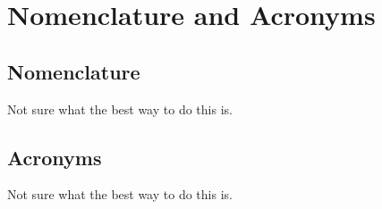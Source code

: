 \clearpage
\chapter{Nomenclature and Acronyms}
\label{sec:Nomenclature_and_Acronyms}

\section{Nomenclature}
\label{sec:Nomenclature}

Not sure what the best way to do this is.

\section{Acronyms}
\label{sec:Acronyms}

Not sure what the best way to do this is.
